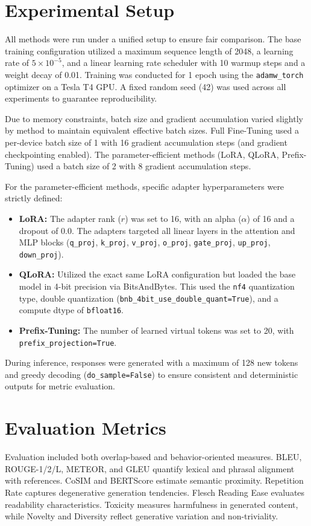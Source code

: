 \documentclass[11pt]{article}
\begin{document}
\section{Experimental Setup}
All methods were run under a unified setup to ensure fair comparison. The base training configuration utilized a maximum sequence length of 2048, a learning rate of \(5 \times 10^{-5}\), and a linear learning rate scheduler with 10 warmup steps and a weight decay of 0.01. Training was conducted for 1 epoch using the \texttt{adamw\_torch} optimizer on a Tesla T4 GPU. A fixed random seed (42) was used across all experiments to guarantee reproducibility.

Due to memory constraints, batch size and gradient accumulation varied slightly by method to maintain equivalent effective batch sizes. Full Fine-Tuning used a per-device batch size of 1 with 16 gradient accumulation steps (and gradient checkpointing enabled). The parameter-efficient methods (LoRA, QLoRA, Prefix-Tuning) used a batch size of 2 with 8 gradient accumulation steps. 

For the parameter-efficient methods, specific adapter hyperparameters were strictly defined:
\begin{itemize}
    \item \textbf{LoRA:} The adapter rank (\(r\)) was set to 16, with an alpha (\(\alpha\)) of 16 and a dropout of 0.0. The adapters targeted all linear layers in the attention and MLP blocks (\texttt{q\_proj}, \texttt{k\_proj}, \texttt{v\_proj}, \texttt{o\_proj}, \texttt{gate\_proj}, \texttt{up\_proj}, \texttt{down\_proj}).
    \item \textbf{QLoRA:} Utilized the exact same LoRA configuration but loaded the base model in 4-bit precision via BitsAndBytes. This used the \texttt{nf4} quantization type, double quantization (\texttt{bnb\_4bit\_use\_double\_quant=True}), and a compute dtype of \texttt{bfloat16}.
    \item \textbf{Prefix-Tuning:} The number of learned virtual tokens was set to 20, with \texttt{prefix\_projection=True}.
\end{itemize}

During inference, responses were generated with a maximum of 128 new tokens and greedy decoding (\texttt{do\_sample=False}) to ensure consistent and deterministic outputs for metric evaluation.

\section{Evaluation Metrics}
Evaluation included both overlap-based and behavior-oriented measures. BLEU, ROUGE-1/2/L, METEOR, and GLEU quantify lexical and phrasal alignment with references. CoSIM and BERTScore estimate semantic proximity. Repetition Rate captures degenerative generation tendencies. Flesch Reading Ease evaluates readability characteristics. Toxicity measures harmfulness in generated content, while Novelty and Diversity reflect generative variation and non-triviality.
\end{document}
